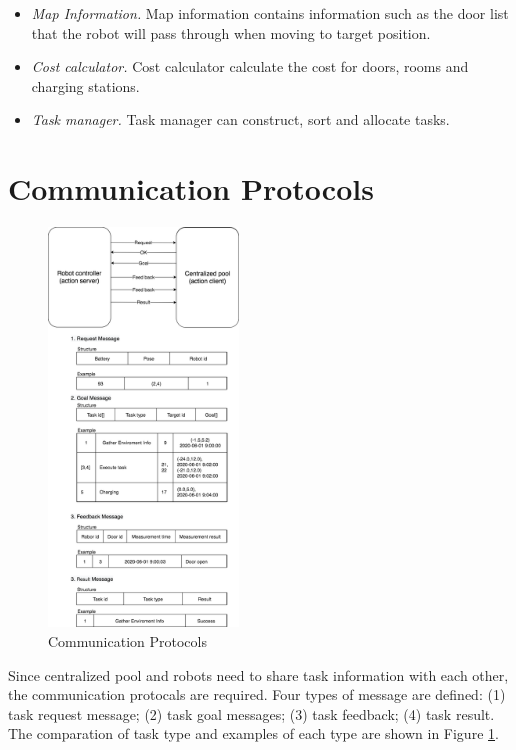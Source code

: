 \begin{itemize}
	\item \textsl{Map Information.} Map information contains information such as the door list that the robot will pass through when moving to target position.
	\item \textsl{Cost calculator.} Cost calculator calculate the cost for doors, rooms and charging stations.
	\item \textsl{Task manager.} Task manager can construct, sort and allocate tasks.
\end{itemize}


\section{Communication Protocols}

\begin{figure}[htbp]
	\centering
	\includegraphics[width = 0.45\textwidth]{content/images/ch3/communication_protocals.drawio.png}
	\caption{Communication Protocols}
	\label{fig:communication_protocals}
\end{figure}

Since centralized pool and robots need to share task information with each other, the communication protocals are required. Four types of message are defined: (1) task request message; (2) task goal messages; (3) task feedback; (4) task result. 
The comparation of task type and examples of each type are shown in Figure \ref{fig:communication_protocals}. 

